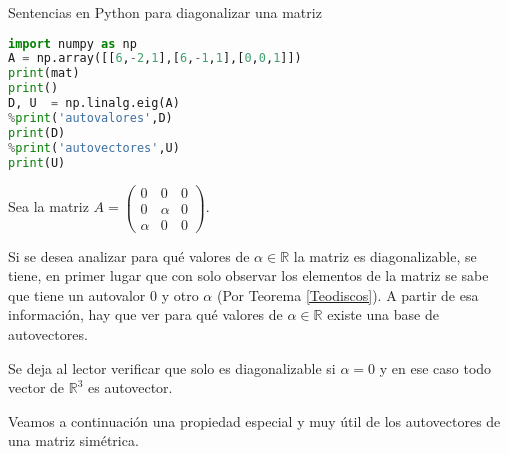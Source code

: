 \begin{remark}
Sentencias en Python para diagonalizar una matriz
\end{remark}
\begin{lstlisting}[language = python, numbers = none, escapechar = !,
    basicstyle = \ttfamily\bfseries, linewidth = 1\linewidth] 
import numpy as np
A = np.array([[6,-2,1],[6,-1,1],[0,0,1]])
print(mat)
print()
D, U  = np.linalg.eig(A) 
%print('autovalores',D)
print(D)
%print('autovectores',U)
print(U)
\end{lstlisting}




\bigskip


\begin{example}

\bigskip






Sea la matriz $A=\left(\begin{array}{ccc} 0 & 0 & 0  \\0  & \alpha & 0
\\ \alpha  & 0 & 0
\end{array}
 \right).$ 

\bigskip

Si se desea analizar  para qué valores de $\alpha \in\mathbb{R}$  la matriz es diagonalizable, se tiene, en primer lugar que con solo observar los elementos de la matriz se sabe que tiene un autovalor $0$ y otro $\alpha$  (Por Teorema \ref{Teodiscos}). A partir de esa información, hay que ver para qué valores de $\alpha \in\mathbb{R}$ existe una base de autovectores.

Se deja al lector  verificar que solo es diagonalizable si $\alpha =0$ y en ese caso todo vector de $\mathbb{R}^3$ es autovector.
\end{example}
Veamos a continuación una propiedad especial  y muy útil de los autovectores de una matriz simétrica.

\bigskip

